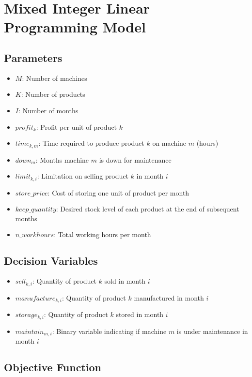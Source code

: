 \documentclass{article}
\begin{document}
\section*{Mixed Integer Linear Programming Model}

\subsection*{Parameters}

\begin{itemize}
    \item $M$: Number of machines
    \item $K$: Number of products
    \item $I$: Number of months
    \item $profit_k$: Profit per unit of product $k$ 
    \item $time_{k,m}$: Time required to produce product $k$ on machine $m$ (hours)
    \item $down_m$: Months machine $m$ is down for maintenance
    \item $limit_{k,i}$: Limitation on selling product $k$ in month $i$
    \item $store\_price$: Cost of storing one unit of product per month
    \item $keep\_quantity$: Desired stock level of each product at the end of subsequent months
    \item $n\_workhours$: Total working hours per month
\end{itemize}

\subsection*{Decision Variables}

\begin{itemize}
    \item $sell_{k,i}$: Quantity of product $k$ sold in month $i$
    \item $manufacture_{k,i}$: Quantity of product $k$ manufactured in month $i$
    \item $storage_{k,i}$: Quantity of product $k$ stored in month $i$
    \item $maintain_{m,i}$: Binary variable indicating if machine $m$ is under maintenance in month $i$
\end{itemize}

\subsection*{Objective Function}
\end{document}

